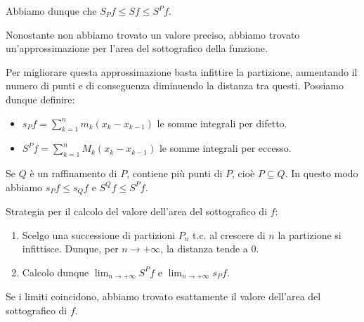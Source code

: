 \documentclass[12pt]{report}
\begin{document}
	Abbiamo dunque che $S_P f \le S f \le S^P f$.
	
	Nonostante non abbiamo trovato un valore preciso, abbiamo trovato un'approssimazione per l'area del sottografico della funzione.
	
	Per migliorare questa approssimazione basta infittire la partizione, aumentando il numero di punti e di conseguenza diminuendo la distanza tra questi.
	Possiamo dunque definire:
	\begin{itemize}
		
		\item $s_P f = \sum_{k=1}^n m_k (x_k - x_{k-1})$ le somme integrali per difetto.
		
		\item $S^P f = \sum_{k=1}^n M_k (x_k - x_{k-1})$ le somme integrali per eccesso.
		
	\end{itemize}
	
	Se $Q$ è un raffinamento di $P$, contiene più punti di $P$, cioè $P \subseteq Q$.
	In questo modo abbiamo $s_P f \le s_Q f$ e $S^Q f \le S^P f$.
	
	Strategia per il calcolo del valore dell'area del sottografico di $f$:
	\begin{enumerate}
		
		\item Scelgo una successione di partizioni $P_n$ t.c. al crescere di $n$ la partizione si infittisce. Dunque, per $n \to +\infty$, la distanza tende a $0$.
		
		\item Calcolo dunque $\lim_{n \to +\infty} S^P f$ e $\lim_{n \to +\infty} s_P f$.
		
	\end{enumerate}
	Se i limiti coincidono, abbiamo trovato esattamente il valore dell'area del sottografico di $f$.
	
\end{document}
